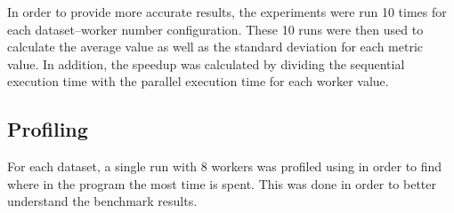 In order to provide more accurate results, the experiments were run 10 times for each dataset--worker number configuration. These 10 runs were then used to calculate the
average value as well as the standard deviation for each metric value. In addition, the speedup was calculated by dividing the sequential execution time with the parallel execution
time for each worker value.

\subsection{Profiling}
For each dataset, a single run with 8 workers was profiled using  in order to find where in the program the most time is spent. This was done in order
to better understand the benchmark results.

